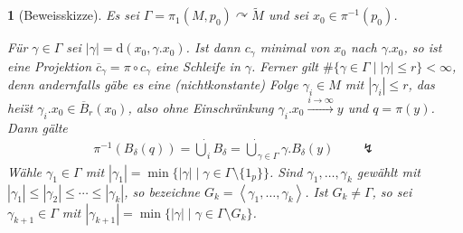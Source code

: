 \documentclass[paper=A4, twoside, chapterprefix=true, bibliography=totoc, headsepline]{scrbook}
\newcommand{\tikzgitter}[3][0.25]{
	\draw[step=#1,gray!15] #2 grid #3;
	\draw[step=2*#1,gray!30] #2 grid #3;
	\fill (0,0) circle(0.1); 
}
\newcommand{\tikztorus}[2][1]{
	\draw[] #2  ellipse (#1*2 and #1*1);
	
	\begin{scope}
		\clip ($#2 - #1*(1, 0.5)$) rectangle ($#2 + #1*(1, 1)$);
		\path[draw,name path=gkreis] ($#2 + #1*(0,0.75)$) ellipse (#1*1.25 and #1*1);
	\end{scope}
	\path[name path=kkreis] ($#2 - #1*(0,0.5)$) ellipse (#1*1 and #1*0.75);
	\path[name intersections={of=gkreis and kkreis}];
	\begin{scope}
		\clip (intersection-1) rectangle ($(intersection-2)+(0,0.5)$);
		\draw ($#2 - #1*(0,0.5)$) ellipse (#1*1 and #1*0.75);
	\end{scope}
	
	\def\torusbreite{#1*2}
	\def\torushoehe{#1*1}
	\def\torusdicke{#1*0.75}
	\coordinate (torusUntenLoch) at ($#2 - #1*(0,0.25)$);
	\coordinate (torusUnten) at ($#2 - #1*(0,1)$);
}
\newcommand{\dop}{\mathrm{d}}
\theoremstyle{plain}
\theoremstyle{nonumberplain}
\theoremstyle{empty}
\newtheorem{emptythm}{}%
\theoremstyle{break}
\begin{document}
\begin{emptythm}[Beweisskizze]
Es sei $\Gamma = \pi_1(M,p_0) \curvearrowright \tilde M$ und sei $x_0 \in \pi^{-1}(p_0)$.
\begin{center}\end{center}
F\"ur $\gamma \in \Gamma$ sei $|\gamma| = \dop(x_0, \gamma . x_0)$.
Ist dann $c_{\gamma}$ minimal von $x_0$ nach $\gamma . x_0$, so ist eine Projektion $\overline c_{\gamma} = \pi \circ c_{\gamma}$ eine Schleife in $\gamma$.
Ferner gilt $\#\{\gamma \in \Gamma \mid | \gamma | \leq r \} < \infty$, denn andernfalls g\"abe es eine (nichtkonstante) Folge $\gamma_i \in M$ mit $|\gamma_i| \leq r$, das hei\"st $\gamma_i . x_0 \in \overline B_r(x_0)$, also ohne Einschr\"ankung $\gamma_i . x_0 \xrightarrow{i \to \infty} y$ und $q = \pi(y)$. Dann g\"alte
\begin{align*}
	\pi^{-1}(B_{\delta}(q)) = \dot \bigcup_{i} B_{\delta} = \dot \bigcup_{\gamma \in \Gamma} \gamma . B_{\delta}(y) \qquad \lightning
\end{align*}
W\"ahle $\gamma_1 \in \Gamma$ mit $|\gamma_1| = \min \{ |\gamma| \mid \gamma \in \Gamma \setminus \{1_p\} \}$.
Sind $\gamma_1, \ldots, \gamma_k$ gew\"ahlt mit $|\gamma_1| \leq |\gamma_2| \leq \cdots \leq |\gamma_k|$, so bezeichne $G_k = \left< \gamma_1, \ldots, \gamma_k\right>$.
Ist $G_k \neq \Gamma$, so sei $\gamma_{k+1} \in \Gamma$ mit $|\gamma_{k+1}| = \min \{ |\gamma| \mid \gamma \in \Gamma \setminus G_k\}$.


\end{emptythm}
\end{document}
